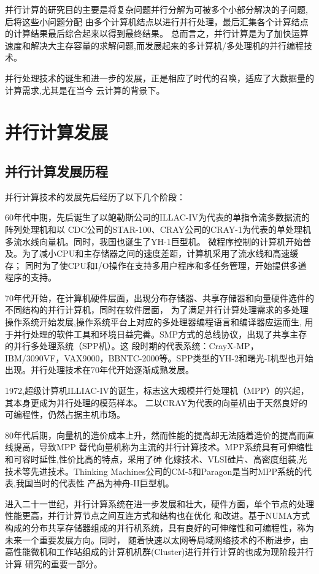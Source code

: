 并行计算的研究目的主要是将复杂问题并行分解为可被多个小部分解决的子问题,后将这些小问题分配
由多个计算机结点以进行并行处理，最后汇集各个计算结点的计算结果最后综合起来以得到最终结果。
总而言之，并行计算是为了加快运算速度和解决大主存容量的求解问题,而发展起来的多计算机/多处理机的并行编程技术。

并行处理技术的诞生和进一步的发展，正是相应了时代的召唤，适应了大数据量的计算需求,尤其是在当今
云计算的背景下。

\section{并行计算发展}
\subsection{并行计算发展历程}
并行计算技术的发展先后经历了以下几个阶段：

60年代中期，先后诞生了以鲍勒斯公司的ILLAC-IV为代表的单指令流多数据流的阵列处理机和以
CDC公司的STAR-100、CRAY公司的CRAY-1为代表的单处理机多流水线向量机。同时，我国也诞生了YH-1巨型机。
微程序控制的计算机开始普及。为了减小CPU和主存储器之间的速度差距，计算机采用了流水线和高速缓存；
同时为了使CPU和I/O操作在支持多用户程序和多任务管理，开始提供多道程序的支持。

70年代开始，在计算机硬件层面，出现分布存储器、共享存储器和向量硬件选件的不同结构的并行计算机，同时在软件层面，
为了满足并行计算处理需求的多处理操作系统开始发展,操作系统平台上对应的多处理器编程语言和编译器应运而生,
用于并行处理的软件工具和环境日益完善。SMP方式的总线协议，出现了共享主存的并行多处理系统（SPP机）。这
段时期的代表系统：CrayX-MP，IBM/3090VF，VAX9000，BBNTC-2000等。SPP类型的YH-2和曙光-I机型也开始
出现。并行处理技术在70年代开始逐渐成熟发展。

1972,超级计算机ILLIAC-IV的诞生，标志这大规模并行处理机（MPP）的兴起，其本身更成为并行处理的模范样本。
二以CRAY为代表的向量机由于天然良好的可编程性，仍然占据主机市场。 

80年代后期，向量机的造价成本上升，然而性能的提高却无法随着造价的提高而直线提高，导致MPP
替代向量机称为主流的并行计算技术。MPP系统具有可伸缩性和可容时延性,性价比高的特点，采用了砷
化嫁技术、VLSI硅片、高密度组装,光技术等先进技术。Thinking Machines公司的CM-5和Paragon是当时MPP系统的代表,我国当时的代表性
产品为神舟-II巨型机。

    进入二十一世纪，并行计算系统在进一步发展和壮大，硬件方面，单个节点的处理性能更高，并行计算节点之间互连方式和结构也在优化
和改进。基于NUMA方式构成的分布共享存储器组成的并行机系统，具有良好的可伸缩性和可编程性，称为未来一个重要发展方向。同时，
随着快速以太网等局域网络技术的不断进步，由高性能微机和工作站组成的计算机机群(Cluster)进行并行计算的也成为现阶段并行计算
研究的重要一部分。

